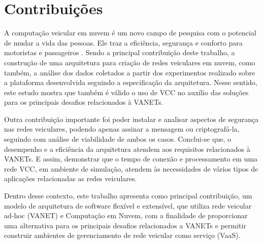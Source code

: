 \documentclass[
	12pt,				%
	oneside,			%
	a4paper,			%
	english,			%
	brazil				%
	]{abntex2ppgsi}
\begin{document}
 
\section{Contribuições}

A computação veicular em nuvem é um novo campo de pesquisa com o potencial de mudar a vida das pessoas. Ele traz a eficiência, segurança e conforto para motoristas e passageiros \cite{falchetti2015vehicular}. Sendo a principal contribuição deste trabalho, a construção de uma arquitetura para criação de redes veiculares em nuvem, como também, a análise dos dados coletados a partir dos experimentos realizado sobre a plataforma desenvolvida seguindo a especificação da arquitetura. Nesse sentido, este estudo mostra que também é válido o uso de VCC no auxílio das soluções para os principais desafios relacionados à VANETs.

Outra contribuição importante foi poder instalar e analisar aspectos de segurança nas redes veiculares, podendo apenas assinar a mensagem ou criptografá-la, seguindo com análise de viabilidade de ambos os casos. Conclui-se que, o desempenho e a eficiência da arquitetura atendem aos requisitos relacionados à VANETs. E assim, demonstrar que o tempo de conexão e processamento em uma rede VCC, em ambiente de simulação, atendem às necessidades de vários tipos de aplicações relacionadas as redes veiculares.

Dentro desse contexto, este trabalho apresenta como principal contribuição, um modelo de arquitetura de software flexível e extensível, que utiliza rede veicular ad-hoc (VANET) e  Computação em Nuvem, com a finalidade de proporcionar uma alternativa para os principais desafios relacionados a VANETs e permitir construir ambientes de gerenciamento de rede veicular como serviço (VaaS).
\end{document}
